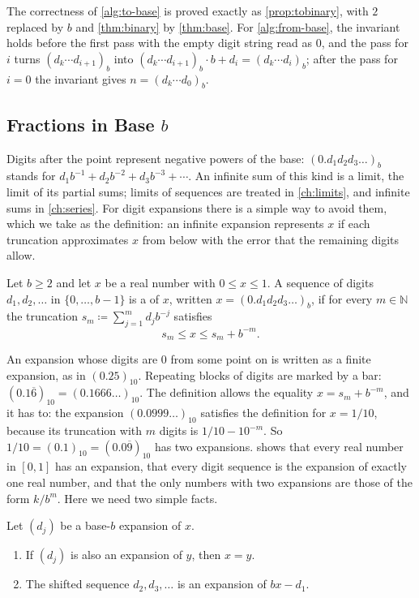 The correctness of \cref{alg:to-base} is proved exactly as \cref{prop:tobinary}, with $2$ replaced by $b$ and \cref{thm:binary} by \cref{thm:base}. For \cref{alg:from-base}, the invariant holds before the first pass with the empty digit string read as $0$, and the pass for $i$ turns $(d_k\cdots d_{i+1})_b$ into $(d_k\cdots d_{i+1})_b\cdot b+d_i=(d_k\cdots d_i)_b$; after the pass for $i=0$ the invariant gives $n=(d_k\cdots d_0)_b$.

\subsection{Fractions in Base $b$}

Digits after the point represent negative powers of the base: $(0.d_1d_2d_3\ldots)_b$ stands for $d_1b^{-1}+d_2b^{-2}+d_3b^{-3}+\cdots$. An infinite sum of this kind is a limit, the limit of its partial sums; limits of sequences are treated in \cref{ch:limits}, and infinite sums in \cref{ch:series}. For digit expansions there is a simple way to avoid them, which we take as the definition: an infinite expansion represents $x$ if each truncation approximates $x$ from below with the error that the remaining digits allow.

\begin{definition}
\label{def:expansion}
Let $b\ge2$ and let $x$ be a real number with $0\le x\le1$. A sequence of digits $d_1,d_2,\ldots$ in $\{0,\ldots,b-1\}$ is a  of $x$, written $x=(0.d_1d_2d_3\ldots)_b$, if for every $m\in\mathbb N$ the truncation $s_m\coloneqq\sum_{j=1}^{m}d_jb^{-j}$ satisfies
\[
s_m\le x\le s_m+b^{-m}.
\]
\end{definition}

An expansion whose digits are $0$ from some point on is written as a finite expansion, as in $(0.25)_{10}$. Repeating blocks of digits are marked by a bar: $(0.1\overline{6})_{10}=(0.1666\ldots)_{10}$. The definition allows the equality $x=s_m+b^{-m}$, and it has to: the expansion $(0.0999\ldots)_{10}$ satisfies the definition for $x=1/10$, because its truncation with $m$ digits is $1/10-10^{-m}$. So $1/10=(0.1)_{10}=(0.0\overline9)_{10}$ has two expansions.  shows that every real number in $[0,1]$ has an expansion, that every digit sequence is the expansion of exactly one real number, and that the only numbers with two expansions are those of the form $k/b^m$. Here we need two simple facts.

\begin{lemma}
\label{lem:expansion-basic}
Let $(d_j)$ be a base-$b$ expansion of $x$.
\begin{enumerate}
\item If $(d_j)$ is also an expansion of $y$, then $x=y$.
\item The shifted sequence $d_2,d_3,\ldots$ is an expansion of $bx-d_1$.
\end{enumerate}
\end{lemma}

